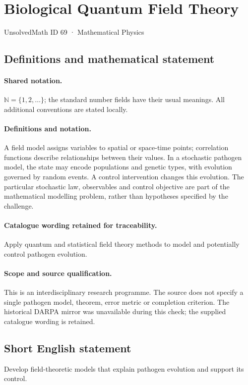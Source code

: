 \documentclass[11pt]{article}
\begin{document}
\setcounter{section}{68}
\section{Biological Quantum Field Theory}\label{69}
{\small UnsolvedMath ID 69 · Mathematical Physics}
\subsection{Definitions and mathematical statement}

\paragraph{Shared notation.}$\mathbb N=\{1,2,\ldots\}$; the standard number fields have their usual meanings. All additional conventions are stated locally.


\paragraph{Definitions and notation.}A field model assigns variables to spatial or space-time points; correlation functions describe relationships between their values. In a stochastic pathogen model, the state may encode populations and genetic types, with evolution governed by random events. A control intervention changes this evolution. The particular stochastic law, observables and control objective are part of the mathematical modelling problem, rather than hypotheses specified by the challenge.

\paragraph{Catalogue wording retained for traceability.}
Apply quantum and statistical field theory methods to model and potentially control pathogen evolution.
\paragraph{Scope and source qualification.}This is an interdisciplinary research programme. The source does not specify a single pathogen model, theorem, error metric or completion criterion. The historical DARPA mirror was unavailable during this check; the supplied catalogue wording is retained.
\subsection{Short English statement}
Develop field-theoretic models that explain pathogen evolution and support its control.
\end{document}
